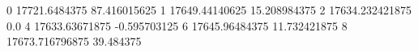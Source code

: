 0 17721.6484375 87.416015625
1 17649.44140625 15.208984375
2 17634.232421875 0.0
4 17633.63671875 -0.595703125
6 17645.96484375 11.732421875
8 17673.716796875 39.484375
